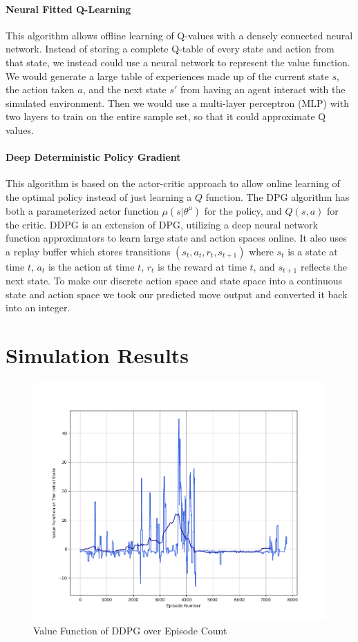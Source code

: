 \documentclass{article}
\begin{document}
\paragraph{Neural Fitted Q-Learning}
This algorithm allows offline learning of Q-values with a densely connected neural network. Instead of storing a complete Q-table of every state and action from that state, we instead could use a neural network to represent the value function. We would generate a large table of experiences made up of the current state $s$, the action taken $a$, and the next state $s'$ from having an agent interact with the simulated environment. Then we would use a multi-layer perceptron (MLP) with two layers to train on the entire sample set, so that it could approximate Q values.

\paragraph{Deep Deterministic Policy Gradient}
This algorithm is based on the actor-critic approach to allow online learning of the optimal policy instead of just learning a $Q$ function. The DPG algorithm has both a parameterized actor function $\mu (s|\theta^{\mu})$ for the policy, and $Q(s,a)$ for the critic. DDPG is an extension of DPG, utilizing a deep neural network function approximators to learn large state and action spaces online. It also uses a replay buffer which stores transitions $(s_{t}, a_{t}, r_{t}, s_{t+1})$ where $s_{t}$ is a state at time $t$, $a_{t}$ is the action at time $t$, $r_{t}$ is the reward at time $t$, and $s_{t+1}$ reflects the next state. To make our discrete action space and state space into a continuous state and action space we took our predicted move output and converted it back into an integer.

\section{Simulation Results}
\begin{figure}
    \centering
    \includegraphics[keepaspectratio,scale=0.5]{media/DDPGValue.png}
    \caption{Value Function of DDPG over Episode Count}
    \label{ddpg}
\end{figure}
\end{document}
